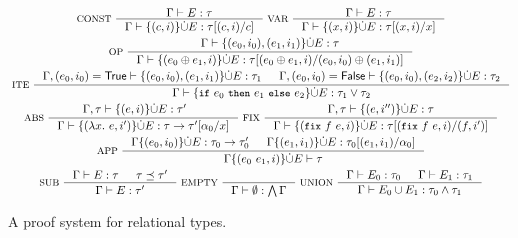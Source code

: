 \begin{figure}
  \centering
  \begin{gather*}
    \inference[ CONST ]{ %
      \Gamma \judges E : \tau }{ %
      \Gamma \judges \disjadd{ (c, i) }{ E } : %
      \replace{ \tau }{ c }{ (c, i) } } 
    \inference[ VAR ]{ %
      \Gamma \judges E : \tau }{ %
      \Gamma \judges \disjadd{ (x, i) }{ E } : %
      \replace{ \tau }{ x }{ (x, i) } } \\
    \inference[ OP ]{ 
      \Gamma \judges %
      \elts{ (e_0, i_0), (e_1, i_1) } \disjunion E : \tau }{ %
      \Gamma \judges \disjadd{ (e_0 \oplus e_1, i) }{ E } : %
      \replace{ \tau }{ (e_0, i_0) \oplus (e_1, i_1) }{ %
        (e_0 \oplus e_1, i) } } \\
    \inference[ ITE ]{ %
      \Gamma, (e_0, i_0) = \true \judges %
      \elts{ (e_0, i_0), (e_1, i_1) } \disjunion E : %
      \tau_1 &
      \Gamma, (e_0, i_0) = \false \judges %
      \elts{ (e_0, i_0), (e_2, i_2) } \disjunion E : %
      \tau_2 }{ %
      \Gamma \judges \disjadd{ \ite{ e_0 }{ e_1 }{ e_2 } }{ E } : %
      \tau_1 \lor \tau_2 } \\
    \inference[ ABS ]{ \Gamma, \tau \judges \disjadd{ (e, i) }{ E } : \tau' &
    }{ %
      \Gamma \judges \disjadd{ (\lambda x.\ e, i') }{ E } : %
      \replace{ \tau \rightarrow \tau' }{ x }{ \alpha_0 } } 
    \inference[ FIX ]{ %
      \Gamma, \tau \judges \disjadd{ (e, i'') }{ E } : \tau }{ %
      \Gamma \judges \disjadd{ ( \fix{ f }{ e }, i ) }{ E } : %
      \replace{ \tau }{ (f, i') }{ ( \fix{ f }{ e }, i ) }
    } \\
    \inference[ APP ]{ %
      \Gamma \disjadd{ (e_0, i_0) }{ E } : \tau_0 \rightarrow \tau_0' & 
      \Gamma \disjadd{ (e_1, i_1) }{ E } : %
      \replace{ \tau_0 }{ \alpha_0 }{ (e_1, i_1) }
    }{ \Gamma \disjadd{ (e_0\ e_1, i) }{ E } \judges \tau } \\
    \inference[ SUB ]{ %
      \Gamma \judges E : \tau & \tau \subtype \tau'
    }{ \Gamma \judges E : \tau' } 
    \inference[ EMPTY ]{ }{ %
      \Gamma \judges \emptyset : \bigland \Gamma }
    \inference[ UNION ]{ 
      \Gamma \judges E_0 : \tau_0 &
      \Gamma \judges E_1 : \tau_1 } %
    { \Gamma \judges E_0 \union E_1 : \tau_0 \land \tau_1 } 
  \end{gather*}
  \caption{A proof system for relational types.}
  \label{fig:reltypes-rules}
\end{figure}

